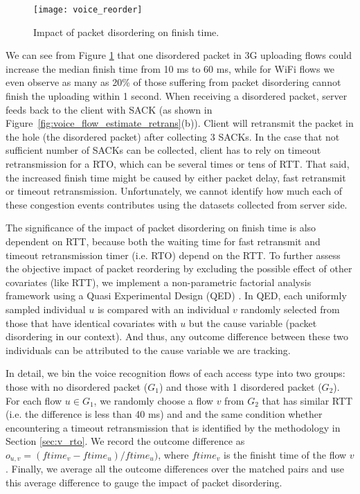 \begin{figure}[th]
\centering
	\texttt{[image: voice\_reorder]}
\caption{Impact of packet disordering on finish time.}
\label{fig:voice_reorder}
\end{figure}

We can see from Figure \ref{fig:voice_reorder} that one disordered packet in 3G uploading flows could increase the median finish time from 10 ms to 60 ms, while for WiFi flows we even observe as many as 20\% of those suffering from packet disordering cannot finish the uploading within 1 second. When receiving a disordered packet, server feeds back to the client with SACK (as shown in Figure~\ref{fig:voice_flow_estimate_retrans}(b)). Client will retransmit the packet in the hole (\ie the disordered packet) after collecting 3 SACKs. In the case that not sufficient number of SACKs can be collected, client has to rely on timeout retransmission for a RTO, which can be several times or tens of RTT. That said, the increased finish time might be caused by either packet delay, fast retransmit or timeout retransmission. Unfortunately, we cannot identify how much each of these congestion events contributes using the datasets collected from server side.

The significance of the impact of packet disordering on finish time is also dependent on RTT, because both the waiting time for fast retransmit and timeout retransmission timer (i.e. RTO) depend on the RTT. To further assess the objective impact of packet reordering by excluding the possible effect of other covariates (like RTT), we implement a non-parametric factorial analysis framework using a Quasi Experimental Design (QED) \cite{krishnan2013video}. In QED, each uniformly sampled individual $u$ is compared with an individual $v$ randomly selected from those that have identical covariates with $u$ but the cause variable (packet disordering in our context). And thus, any outcome difference between these two individuals can be attributed to the cause variable we are tracking. 

In detail, we bin the voice recognition flows of each access type into two groups: those with no disordered packet ($G_1$) and those with 1 disordered packet ($G_2$). For each flow $u \in G_1$, we randomly choose a flow $v$ from $G_2$ that has similar RTT (i.e. the difference is less than 40 ms) and and the same condition whether encountering a timeout retransmission that is identified by the methodology in Section \ref{sec:v_rto}. We record the outcome difference as $o_{u,v} = (ftime_{v} - ftime_{u}) / ftime_{u})$, where $ftime_v$ is the finisht time of the flow $v$. Finally, we average all the outcome differences over the matched pairs and use this average difference to gauge the impact of packet disordering.

